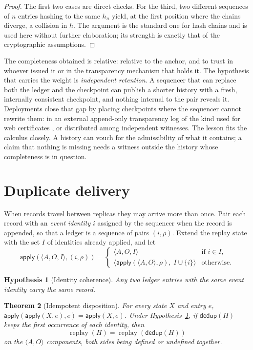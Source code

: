 \documentclass[11pt,openany]{book}
\newtheorem{theorem}{Theorem}[chapter]
\newtheorem{hypothesis}[theorem]{Hypothesis}
\theoremstyle{remark}
\newcommand{\replay}{\operatorname{replay}}
\begin{document}
\begin{proof}
The first two cases are direct checks. For the third, two different
sequences of $n$ entries hashing to the same $h_n$ yield, at the first
position where the chains diverge, a collision in $h$. The argument is
the standard one for hash chains and is used here without further
elaboration; its strength is exactly that of the cryptographic
assumptions.
\end{proof}

The completeness obtained is relative: relative to the anchor, and to
trust in whoever issued it or in the transparency mechanism that holds
it. The hypothesis that carries the weight is \emph{independent
retention}.
A sequencer that can replace both the ledger and the checkpoint can
publish a shorter history with a fresh, internally consistent checkpoint,
and nothing internal to the pair reveals it. Deployments close that gap by
placing checkpoints where the sequencer cannot rewrite them: in an
external append-only transparency log of the kind used for web
certificates \cite{rfc6962},
or distributed among independent witnesses. The lesson fits the calculus
closely. A history can vouch for the admissibility of what it contains; a
claim that nothing is missing needs a witness outside the history whose
completeness is in question.

\section{Duplicate delivery}

When records travel between replicas they may arrive more than once. Pair
each record with an \emph{event identity} $i$ assigned by the sequencer
when the record is appended, so that a ledger is a sequence of pairs
$(i,\rho)$. Extend the replay state with the set $I$ of identities already
applied, and let
\[
\mathsf{apply}(\langle A,O,I\rangle,(i,\rho))=
\begin{cases}
\langle A,O,I\rangle & \text{if }i\in I,\\
\langle \mathsf{apply}(\langle A,O\rangle,\rho),\;I\cup\{i\}\rangle
& \text{otherwise.}
\end{cases}
\]

\begin{hypothesis}[Identity coherence]\label{hyp:coherence}
Any two ledger entries with the same event identity carry the same record.
\end{hypothesis}

\begin{theorem}[Idempotent disposition]
For every state $X$ and entry $e$,
$\mathsf{apply}(\mathsf{apply}(X,e),e)=\mathsf{apply}(X,e)$. Under
Hypothesis~\ref{hyp:coherence}, if $\mathsf{dedup}(H)$ keeps the first
occurrence of each identity, then
\[
\replay(H)=\replay(\mathsf{dedup}(H))
\]
on the $\langle A,O\rangle$ components, both sides being defined or
undefined together.
\end{theorem}
\end{document}
